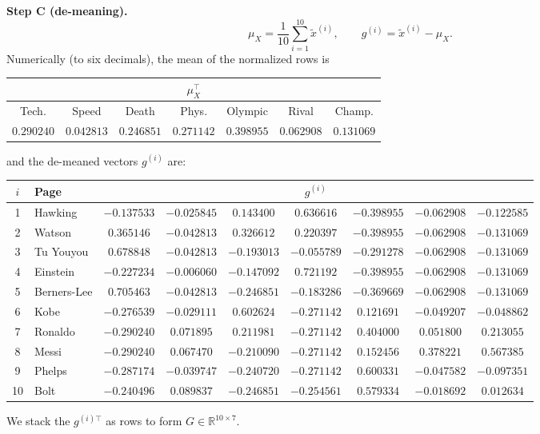 \documentclass[fleqn]{article}
\begin{document}
    \medskip
    \noindent\textbf{Step C (de-meaning).}
    \[
        \mu_X=\frac{1}{10}\sum_{i=1}^{10}\tilde{x}^{(i)},\qquad
        g^{(i)}=\tilde{x}^{(i)}-\mu_X.
    \]
    Numerically (to six decimals), the mean of the normalized rows is
    \begin{center}
    {\footnotesize
    \begin{tabular}{ccccccc}
        \multicolumn{7}{c}{$\mu_X^\top$} \\
        \hline
        Tech. & Speed & Death & Phys. & Olympic & Rival & Champ. \\
        \hline
        $0.290240$ & $0.042813$ & $0.246851$ & $0.271142$ & $0.398955$ & $0.062908$ & $0.131069$ \\
        \hline
    \end{tabular}
    }
    \end{center}
    and the de-meaned vectors $g^{(i)}$ are:
    \begin{center}
    {\footnotesize
    \begin{tabular}{c|l|ccccccc}
        $i$ & Page & \multicolumn{7}{c}{$g^{(i)}$} \\
        \hline
        1 & Hawking & $-0.137533$ & $-0.025845$ & $0.143400$ & $0.636616$ & $-0.398955$ & $-0.062908$ & $-0.122585$ \\
        2 & Watson & $0.365146$ & $-0.042813$ & $0.326612$ & $0.220397$ & $-0.398955$ & $-0.062908$ & $-0.131069$ \\
        3 & Tu Youyou & $0.678848$ & $-0.042813$ & $-0.193013$ & $-0.055789$ & $-0.291278$ & $-0.062908$ & $-0.131069$ \\
        4 & Einstein & $-0.227234$ & $-0.006060$ & $-0.147092$ & $0.721192$ & $-0.398955$ & $-0.062908$ & $-0.131069$ \\
        5 & Berners-Lee & $0.705463$ & $-0.042813$ & $-0.246851$ & $-0.183286$ & $-0.369669$ & $-0.062908$ & $-0.131069$ \\
        6 & Kobe & $-0.276539$ & $-0.029111$ & $0.602624$ & $-0.271142$ & $0.121691$ & $-0.049207$ & $-0.048862$ \\
        7 & Ronaldo & $-0.290240$ & $0.071895$ & $0.211981$ & $-0.271142$ & $0.404000$ & $0.051800$ & $0.213055$ \\
        8 & Messi & $-0.290240$ & $0.067470$ & $-0.210090$ & $-0.271142$ & $0.152456$ & $0.378221$ & $0.567385$ \\
        9 & Phelps & $-0.287174$ & $-0.039747$ & $-0.240720$ & $-0.271142$ & $0.600331$ & $-0.047582$ & $-0.097351$ \\
        10 & Bolt & $-0.240496$ & $0.089837$ & $-0.246851$ & $-0.254561$ & $0.579334$ & $-0.018692$ & $0.012634$ \\
        \hline
    \end{tabular}
    }
    \end{center}
    We stack the $g^{(i)\top}$ as rows to form $G\in\mathbb{R}^{10\times 7}$.
\end{document}
